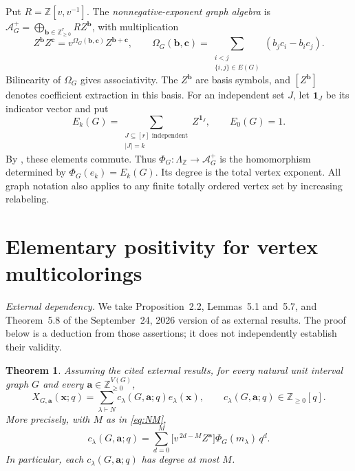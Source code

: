 \documentclass[11pt]{article}
\newtheorem{theorem}{Theorem}[section]
\theoremstyle{remark}
\newcommand{\Z}{\mathbb Z}
\newcommand{\NN}{\mathbb Z_{\geq 0}}
\newcommand{\xx}{\mathbf x}
\newcommand{\avec}{\mathbf a}
\newcommand{\bvec}{\mathbf b}
\newcommand{\cvec}{\mathbf c}
\newcommand{\one}{\mathbf 1}
\newcommand{\cA}{\mathcal A}
\numberwithin{equation}{section}
\begin{document}
Put $R=\Z[v,v^{-1}]$. The \emph{nonnegative-exponent graph algebra} is
$\cA_G^+=\bigoplus_{\bvec\in\NN^r} RZ^{\bvec}$, with multiplication
\begin{equation}\label{eq:algebra}
 Z^{\bvec}Z^{\cvec}=v^{\Omega_G(\bvec,\cvec)}Z^{\bvec+\cvec},
 \qquad
 \Omega_G(\bvec,\cvec)=\sum_{\substack{i<j\\\{i,j\}\in E(G)}}
                  (b_jc_i-b_ic_j).
\end{equation}
Bilinearity of $\Omega_G$ gives associativity. The $Z^{\bvec}$ are basis
symbols, and $[Z^{\bvec}]$ denotes coefficient extraction in this basis.
For an independent set $J$, let $\one_J$ be its indicator vector and put
\begin{equation}\label{eq:independent-sums}
 E_k(G)=\sum_{\substack{J\subseteq[r]\text{ independent}\\|J|=k}}
           Z^{\one_J},\qquad E_0(G)=1.
\end{equation}
By \cite[Proposition~2.2]{OAI}, these elements commute. Thus
$\Phi_G:\Lambda_{\Z}\to\cA_G^+$ is the homomorphism determined by
$\Phi_G(e_k)=E_k(G)$. Its degree is the total vertex exponent.
All graph notation also applies to any finite totally ordered vertex set
by increasing relabeling.

\section{Elementary positivity for vertex multicolorings}\label{sec:proof}
\noindent\textit{External dependency.}
We take Proposition~2.2, Lemmas~5.1 and~5.7, and Theorem~5.8 of the
September~24, 2026 version of \cite{OAI} as external results.
The proof below is a deduction from those assertions; it does not
independently establish their validity.

\begin{theorem}\label{thm:main}
Assuming the cited external results, for every natural unit interval
graph $G$ and every $\avec\in\NN^{V(G)}$,
\begin{equation}\label{eq:main}
 X_{G,\avec}(\xx;q)=\sum_{\lambda\vdash N}
                  c_\lambda(G,\avec;q)e_\lambda(\xx),
 \qquad c_\lambda(G,\avec;q)\in\NN[q].
\end{equation}
More precisely, with $M$ as in \eqref{eq:NM},
\begin{equation}\label{eq:coefficient-formula}
 c_\lambda(G,\avec;q)
   =\sum_{d=0}^{M}
       \bigl[v^{\,2d-M}Z^{\avec}\bigr]\Phi_G(m_\lambda)\,q^d.
\end{equation}
In particular, each $c_\lambda(G,\avec;q)$ has degree at most $M$.
\end{theorem}
\end{document}
